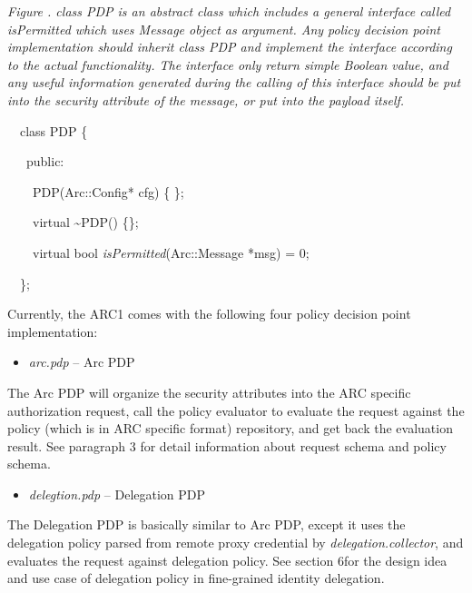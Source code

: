 \documentclass{article}
\newcommand\liststyleWWviiiNumxiii{%
\renewcommand\labelitemi{[F0B7?]}
\renewcommand\labelitemii{[F0B7?]}
\renewcommand\labelitemiii{[F0B7?]}
\renewcommand\labelitemiv{[F0B7?]}
}
\newcounter{Figure}
\renewcommand\theFigure{\arabic{Figure}}
\begin{document}
{\centering{}\itshape\color{black}
Figure \stepcounter{Figure}{\theFigure}. class PDP is an abstract class
which includes a general interface called isPermitted which uses
Message object as argument. Any policy decision point implementation
should inherit class PDP and implement the interface according to the
actual functionality. The interface only return simple Boolean value,
and any useful information generated during the calling of this
interface should be put into the security attribute of the message, or
put into the payload itself.
\par}

\begin{center}
\begin{minipage}{3.8752in}
{\color{black}
\ \ class PDP \{}

{\upshape\color{black}
\ \ \ public:}

{\upshape\color{black}
\ \ \ \ PDP(Arc::Config* cfg) \{ \};}

{\upshape\color{black}
\ \ \ \ virtual \~{}PDP() \{\};}

{\upshape\color{black}
\ \ \ \ virtual bool \textit{isPermitted}(Arc::Message *msg) = 0;}

{\color{black}
\ \ \};}
\end{minipage}
\end{center}
{\upshape\color{black}
Currently, the ARC1 comes with the following four policy decision point
implementation: }

\liststyleWWviiiNumxiii
\begin{itemize}
\item {\color{black}
\textit{arc.pdp }{}-- Arc PDP}
\end{itemize}
{\upshape\color{black}
The Arc PDP will organize the security attributes into the ARC specific
authorization request, call the policy evaluator to evaluate the
request against the policy (which is in ARC specific format)
repository, and get back the evaluation result. See paragraph 3 for
detail information about request schema and policy schema.}

\liststyleWWviiiNumxiii
\begin{itemize}
\item {\color{black}
\textit{delegtion.pdp} -- Delegation PDP}
\end{itemize}
{\upshape\color{black}
The Delegation PDP is basically similar to Arc PDP, except it uses the
delegation policy parsed from remote proxy credential by
\textit{delegation.collector}, and evaluates the request against
delegation policy. See section 6for the design idea and use case of
delegation policy in fine-grained identity delegation.}
\end{document}
